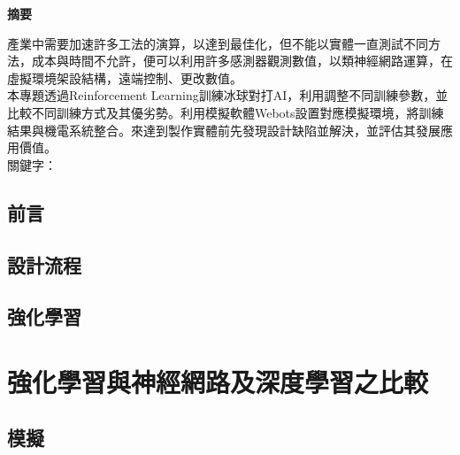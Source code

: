 \documentclass[14pt,a4paper]{article}
\begin{document}
\begin{center}

\LARGE\textbf{摘要}\\
\begin{Large}
\begin{flushleft}
\hspace{12pt} 產業中需要加速許多工法的演算，以達到最佳化，但不能以實體一直測試不同方法，成本與時間不允許，便可以利用許多感測器觀測數值，以類神經網路運算，在虛擬環境架設結構，遠端控制、更改數值。\\
 \hspace{12pt} 本專題透過Reinforcement Learning訓練冰球對打AI，利用調整不同訓練參數，並比較不同訓練方式及其優劣勢。利用模擬軟體Webots設置對應模擬環境，將訓練結果與機電系統整合。來達到製作實體前先發現設計缺陷並解決，並評估其發展應用價值。\\[12 pt]
關鍵字：
\end{flushleft}
\end{Large}
\newpage
\renewcommand{\contentsname}{\centerline{\fontsize{18pt}{\baselineskip}\selectfont\textbf{目\quad 錄}}}
\tableofcontents
\newpage
\renewcommand{\listfigurename}{\centerline{\fontsize{18pt}{\baselineskip}\selectfont\textbf{圖\quad 表\quad 目\quad 錄 }}}
\listoffigures
\newpage
\end{center}
\newpage
\section{前言}
\setcounter{page}{1}
\newpage
\section{設計流程}
\newpage
\section{強化學習}
\chapter{強化學習與神經網路及深度學習之比較}
\newpage
\section{模擬}
\end{document}
